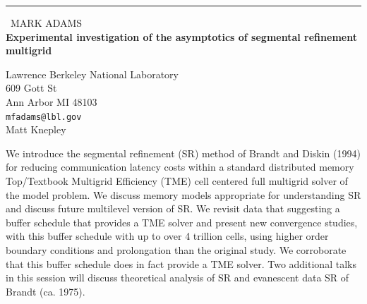 \documentclass{report}
\begin{document}
\begin{center}
\rule{6in}{1pt} \
{\large MARK ADAMS \\
{\bf Experimental investigation of the asymptotics of segmental refinement multigrid}}

Lawrence Berkeley National Laboratory \\ 609 Gott St \\ Ann Arbor MI 48103
\\
{\tt mfadams@lbl.gov}\\
Matt Knepley\end{center}

We introduce the segmental refinement (SR) method of Brandt and Diskin
(1994) for reducing communication latency costs within a standard
distributed memory Top/Textbook Multigrid Efficiency (TME) cell centered
full multigrid solver of the model problem. We discuss memory models
appropriate for understanding SR and discuss future multilevel version of
SR. We revisit data that suggesting a buffer schedule that provides a TME
solver and present new convergence studies, with this buffer schedule
with up to over 4 trillion cells, using higher order boundary conditions
and prolongation than the original study. We corroborate that this buffer
schedule does in fact provide a TME solver. Two additional talks in this
session will discuss theoretical analysis of SR and evanescent data SR of
Brandt (ca. 1975).
\end{document}
